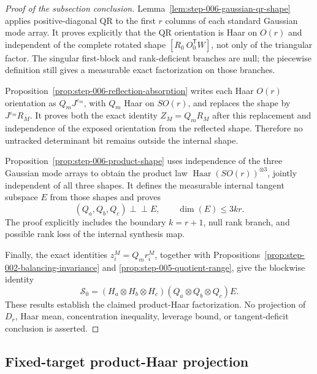 \begin{proof}[Proof of the subsection conclusion]

Lemma~\ref{lem:step-006-gaussian-qr-shape} applies positive-diagonal QR to
the first \(r\) columns of each standard Gaussian mode array. It proves
explicitly that the QR orientation is Haar on \(O(r)\) and
independent of the complete rotated shape
\([R_0\ O_0^{\mathsf T}W]\), not only of the triangular factor. The singular
first-block and rank-deficient branches are null; the piecewise definition
still gives a measurable exact factorization on those branches.

Proposition~\ref{prop:step-006-reflection-absorption} writes each Haar
\(O(r)\) orientation as \(Q_mJ^{\varepsilon_m}\), with \(Q_m\) Haar on
\(SO(r)\), and replaces the shape by \(J^{\varepsilon_m}R_M\). It proves both
the exact identity \(Z_M=Q_mR_M\) after this replacement and independence of
the exposed orientation from the reflected shape. Therefore no untracked
determinant bit remains outside the internal shape.

Proposition~\ref{prop:step-006-product-shape} uses independence of the three
Gaussian mode arrays to obtain the product law
  \(\operatorname{Haar}(SO(r))^{\otimes3}\), jointly independent of all three
shapes. It defines the measurable internal tangent subspace \(E\) from those
shapes and proves
\[
  (Q_a,Q_b,Q_c)\perp\!\!\!\perp E,
  \qquad \dim(E)\le3kr.
\]
The proof explicitly includes the boundary \(k=r+1\), null rank branch, and
possible rank loss of the internal synthesis map.

Finally, the exact identities \(z_i^M=Q_mr_i^M\), together with
Propositions~\ref{prop:step-002-balancing-invariance} and
\ref{prop:step-005-quotient-range}, give the blockwise identity
\[
  \mathscr S_0
  =(H_a\otimes H_b\otimes H_c)
   (Q_a\otimes Q_b\otimes Q_c)E.
\]
These results establish the claimed product-Haar factorization. No
projection of \(D_r\), Haar mean, concentration inequality, leverage bound,
or tangent-deficit conclusion is asserted.

\end{proof}

\subsection{Fixed-target product-Haar projection}\label{app:step-007}


